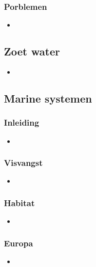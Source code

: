 \documentclass[12pt]{article}
\begin{document}
    \subsubsection*{Porblemen}
    \begin{itemize}
        \item 
    \end{itemize}


    \subsection{Zoet water}
    \begin{itemize}
        \item 
    \end{itemize}


    \subsection{Marine systemen}
    \subsubsection*{Inleiding}
    \begin{itemize}
        \item 
    \end{itemize}

    \subsubsection*{Visvangst}
    \begin{itemize}
        \item 
    \end{itemize}

    \subsubsection*{Habitat}
    \begin{itemize}
        \item 
    \end{itemize}

    \subsubsection*{Europa}
    \begin{itemize}
        \item 
    \end{itemize}
\end{document}
